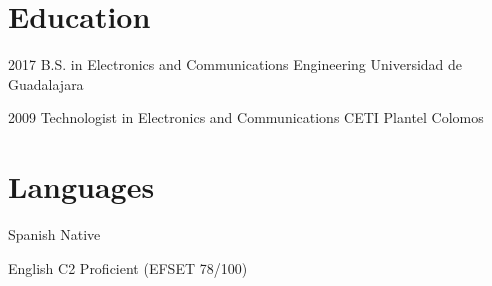 \documentclass[10pt, letterpaper]{article} %
\begin{document}

\section{Education}

\dateitem
{2017}
{B.S. in Electronics and Communications Engineering}
{Universidad de Guadalajara}


\dateitem
{2009}
{Technologist in Electronics and Communications}
{CETI Plantel Colomos}


\section{Languages}

\langitem
{Spanish}
{Native}

\langitem
{English}
{C2 Proficient (EFSET 78/100)}

\end{document}
